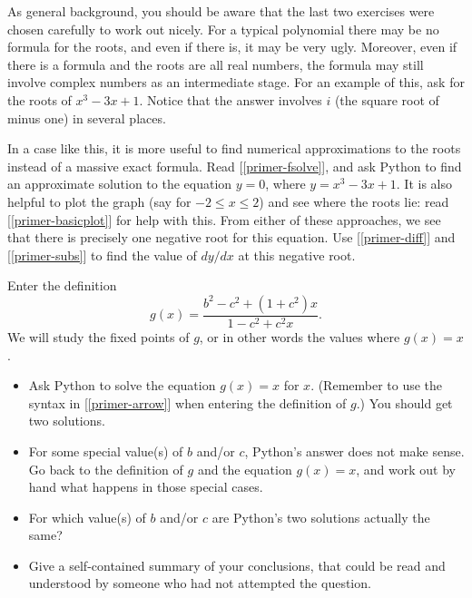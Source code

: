 \documentclass[a4paper,10pt]{amsbook}
\begin{document}
\begin{exercise}\label{ex-cubic-horrid}
 As general background, you should be aware that the last two
 exercises were chosen carefully to work out nicely.  For a typical
 polynomial there may be no formula for the roots, and even if there
 is, it may be very ugly.  Moreover, even if there is a formula and
 the roots are all real numbers, the formula may still involve complex
 numbers as an intermediate stage.  For an example of this, ask for
 the roots of $x^3-3x+1$.  Notice that the answer involves $i$ (the
 square root of minus one) in several places.

 In a case like this, it is more useful to find numerical
 approximations to the roots instead of a massive exact
 formula.  Read [\ref{primer-fsolve}], and ask Python to find an
 approximate solution to the equation $y=0$, where $y=x^3-3x+1$.
 It is also helpful to plot the graph (say for $-2\leq x\leq 2$) and
 see where the roots lie: read [\ref{primer-basicplot}] for help with
 this.  From either of these approaches, we see that there is
 precisely one negative root for this equation.  Use [\ref{primer-diff}]
 and [\ref{primer-subs}] to find the value of $dy/dx$ at this negative
 root. 
\end{exercise}

\begin{exercise}\label{ex-mobius-fix}
 Enter the definition
 \[ g(x) = \frac{b^2-c^2+(1+c^2)x}{1-c^2+ c^2x}. \]
 We will study the fixed points of $g$, or in other words the values
 where $g(x)=x$.  
 \begin{itemize}
  \item[(a)] Ask Python to solve the equation $g(x)=x$ for
   $x$.  (Remember to use the syntax in [\ref{primer-arrow}]
   when entering the definition of $g$.)  You should get two
   solutions. 
  \item[(b)] For some special value(s) of $b$ and/or $c$, Python's
   answer does not make sense.  Go back to the definition of $g$ and
   the equation $g(x)=x$, and work out by hand what happens in those
   special cases.
  \item[(c)] For which value(s) of $b$ and/or $c$ are Python's two
   solutions actually the same?
  \item[(d)] Give a self-contained summary of your conclusions, that
   could be read and understood by someone who had not attempted the
   question. 
 \end{itemize}
\end{exercise}
\end{document}
